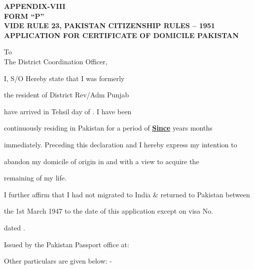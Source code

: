 \documentclass{article}
\begin{document}
\begin{center}
\textbf{APPENDIX-VIII} \\
\textbf{FORM “P”} \\
\textbf{VIDE RULE 23, PAKISTAN CITIZENSHIP RULES – 1951} \\
\textbf{APPLICATION FOR CERTIFICATE OF DOMICILE PAKISTAN}
\end{center}

\vspace{0.5cm}

To \\
The District Coordination Officer,

\vspace{0.5cm}

I, \underline{\hspace{5cm}} S/O \underline{\hspace{5cm}} Hereby state that I was formerly

the resident of \underline{\hspace{5cm}} District \underline{\hspace{5cm}} Rev/Adm Punjab

have arrived in Tehsil \underline{\hspace{5cm}} day of \underline{\hspace{2cm}}. I have been

continuously residing in Pakistan for a period of \underline{\textbf{Since}} \underline{\hspace{2cm}} years \underline{\hspace{2cm}} months

immediately. Preceding this declaration and I hereby express my intention to

abandon my domicile of origin in \underline{\hspace{5cm}} and with a view to acquire the

remaining of my life.

I further affirm that I had not migrated to India \& returned to Pakistan between

the 1st March 1947 to the date of this application except on visa No. \underline{\hspace{5cm}}

dated \underline{\hspace{5cm}}.

Issued by the Pakistan Passport office at: \underline{\hspace{5cm}}

Other particulars are given below: -
\end{document}
